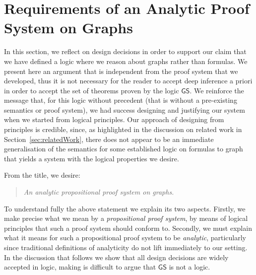 \documentclass{lmcs} %
\def\GS{\mathsf{GS}}
\theoremstyle{plain}
\begin{document}

\section{Requirements of an Analytic Proof System on Graphs}\label{sec:phil}

\newcommand{\requirement}[2]{\begin{center}\textbf{Requirement: #1}\\ \textit{#2}\end{center}}
\newcommand{\design}[2]{\begin{center}\textbf{Design choice: #1}\\ \textit{#2}\end{center}}
\newcommand{\consequence}[2]{\begin{center}\textbf{Consequence: #1}\\ \textit{#2}\end{center}}
\def\mp{modus ponens\xspace}




In this section, we reflect on design decisions in order to support our claim that we have defined a logic where we reason about graphs rather than formulas.
We present here an argument that is independent from the proof system that we developed, thus it is not necessary for the reader to accept deep inference a priori in order to accept the set of theorems proven by the logic $\GS$.
We reinforce the message that, for this logic without precedent (that is without a pre-existing semantics or proof system), we had success designing and justifying our system when we started from logical principles. Our approach of designing from principles is credible, since, as highlighted in the discussion on related work in Section~\ref{sec:relatedWork}, there does not appear to be an immediate generalisation of the semantics for some established logic on formulas to graph that yields a system with the logical properties we desire.


From the title, we desire:
\begin{quote}
	\textit{An {analytic} {propositional proof system} on {graphs}. }
\end{quote}
To understand fully the above statement we explain its two aspects. 
Firstly, we make precise what we mean by a \emph{propositional proof system}, by means of logical principles that such a proof system should conform to.
Secondly, we must explain what it means for such a propositional proof system to be \emph{analytic}, 
particularly since traditional definitions of analyticity do not lift immediately to our setting.
In the discussion that follows we show that all design decisions are widely accepted in logic, making is difficult to argue that $\GS$ is not a logic.
\end{document}

